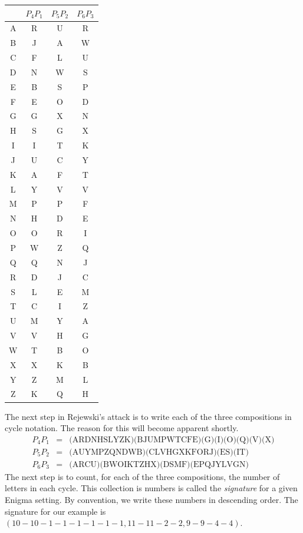 \documentclass{book}
\theoremstyle{plain}
\theoremstyle{definition}
\begin{document}
\begin{center}
\begin{tabular}{c|ccc}
& $P_4P_1$ & $P_5P_2$ & $P_6P_3$ \\
\hline
A & R & U & R \\
B & J & A & W \\
C & F & L & U \\
D & N & W & S \\
E & B & S & P \\
F & E & O & D \\
G & G & X & N \\
H & S & G & X \\
I & I & T & K \\
J & U & C & Y \\
K & A & F & T \\
L & Y & V & V \\
M & P & P & F \\
N & H & D & E \\
O & O & R & I \\
P & W & Z & Q \\
Q & Q & N & J \\
R & D & J & C \\
S & L & E & M \\
T & C & I & Z \\
U & M & Y & A \\
V & V & H & G \\
W & T & B & O \\
X & X & K & B \\
Y & Z & M & L \\
Z & K & Q & H \\
\end{tabular}
\end{center}

The next step in Rejewski's attack is to write each of the three compositions in cycle notation. The reason for this will become apparent shortly.
\begin{eqnarray*}
P_4P_1 &=& \text{(ARDNHSLYZK)(BJUMPWTCFE)(G)(I)(O)(Q)(V)(X)} \\
P_5P_2 &=& \text{(AUYMPZQNDWB)(CLVHGXKFORJ)(ES)(IT)} \\
P_6P_3 &=& \text{(ARCU)(BWOIKTZHX)(DSMF)(EPQJYLVGN)}
\end{eqnarray*}
The next step is to count, for each of the three compositions, the number of letters in each cycle. This collection is numbers is called the {\it signature} for a given Enigma setting. By convention, we write these numbers in descending order. The signature for our example is $(10-10-1-1-1-1-1-1,11-11-2-2,9-9-4-4)$.
\end{document}
